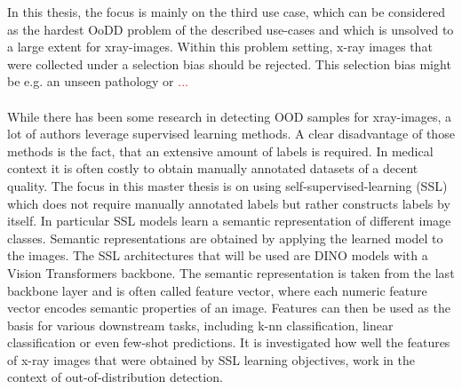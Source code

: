 In this thesis, the focus is mainly on the third use case, which can be considered as the hardest OoDD problem of the described use-cases and which is unsolved to a large extent for xray-images.
Within this problem setting, x-ray images that were collected under a selection bias should be rejected.
This selection bias might be e.g. an unseen pathology or \textcolor{red}{...}
\\
\\
While there has been some research in detecting OOD samples for xray-images, a lot of authors leverage supervised learning methods.
A clear disadvantage of those methods is the fact, that an extensive amount of labels is required.
In medical context it is often costly to obtain manually annotated datasets of a decent quality.
The focus in this master thesis is on using self-supervised-learning (SSL) which does not require manually annotated labels but rather constructs labels by itself. 
In particular SSL models learn a semantic representation of different image classes.
Semantic representations are obtained by applying the learned model to the images.
The SSL architectures that will be used are DINO models with a Vision Transformers backbone.
The semantic representation is taken from the last backbone layer and is often called feature vector, where each numeric feature vector encodes semantic properties of an image.
Features can then be used as the basis for various downstream tasks, including k-nn classification, linear classification or even few-shot predictions.
It is investigated how well the features of x-ray images that were obtained by SSL learning objectives, work in the context of out-of-distribution detection.